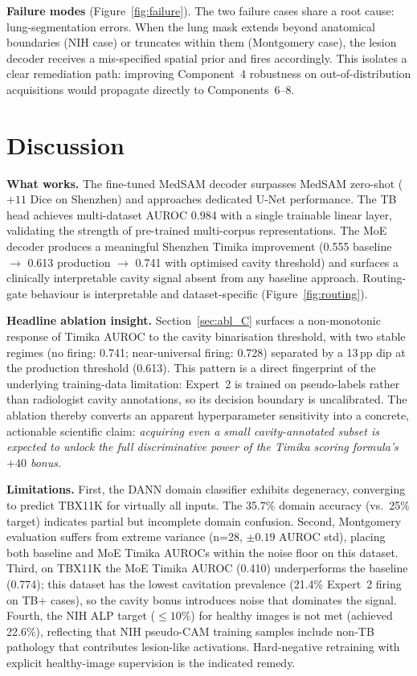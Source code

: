 \documentclass{article}
\begin{document}
\textbf{Failure modes} (Figure~\ref{fig:failure}). The two failure cases share a root cause: lung-segmentation errors. When the lung mask extends beyond anatomical boundaries (NIH case) or truncates within them (Montgomery case), the lesion decoder receives a mis-specified spatial prior and fires accordingly. This isolates a clear remediation path: improving Component~4 robustness on out-of-distribution acquisitions would propagate directly to Components~6--8.

\section{Discussion}
\label{sec:discussion}

\textbf{What works.} The fine-tuned MedSAM decoder surpasses MedSAM zero-shot ($+11$ Dice on Shenzhen) and approaches dedicated U-Net performance. The TB head achieves multi-dataset AUROC 0.984 with a single trainable linear layer, validating the strength of pre-trained multi-corpus representations. The MoE decoder produces a meaningful Shenzhen Timika improvement (0.555 baseline $\to$ 0.613 production $\to$ 0.741 with optimised cavity threshold) and surfaces a clinically interpretable cavity signal absent from any baseline approach. Routing-gate behaviour is interpretable and dataset-specific (Figure~\ref{fig:routing}).

\textbf{Headline ablation insight.} Section~\ref{sec:abl_C} surfaces a non-monotonic response of Timika AUROC to the cavity binarisation threshold, with two stable regimes (no firing: 0.741; near-universal firing: 0.728) separated by a 13\,pp dip at the production threshold (0.613). This pattern is a direct fingerprint of the underlying training-data limitation: Expert~2 is trained on pseudo-labels rather than radiologist cavity annotations, so its decision boundary is uncalibrated. The ablation thereby converts an apparent hyperparameter sensitivity into a concrete, actionable scientific claim: \emph{acquiring even a small cavity-annotated subset is expected to unlock the full discriminative power of the Timika scoring formula's $+40$ bonus.}

\textbf{Limitations.} First, the DANN domain classifier exhibits degeneracy, converging to predict TBX11K for virtually all inputs. The 35.7\% domain accuracy (vs.\ 25\% target) indicates partial but incomplete domain confusion. Second, Montgomery evaluation suffers from extreme variance (n=28, $\pm 0.19$ AUROC std), placing both baseline and MoE Timika AUROCs within the noise floor on this dataset. Third, on TBX11K the MoE Timika AUROC (0.410) underperforms the baseline (0.774); this dataset has the lowest cavitation prevalence (21.4\% Expert~2 firing on TB+ cases), so the cavity bonus introduces noise that dominates the signal. Fourth, the NIH ALP target ($\leq 10\%$) for healthy images is not met (achieved 22.6\%), reflecting that NIH pseudo-CAM training samples include non-TB pathology that contributes lesion-like activations. Hard-negative retraining with explicit healthy-image supervision is the indicated remedy.
\end{document}
